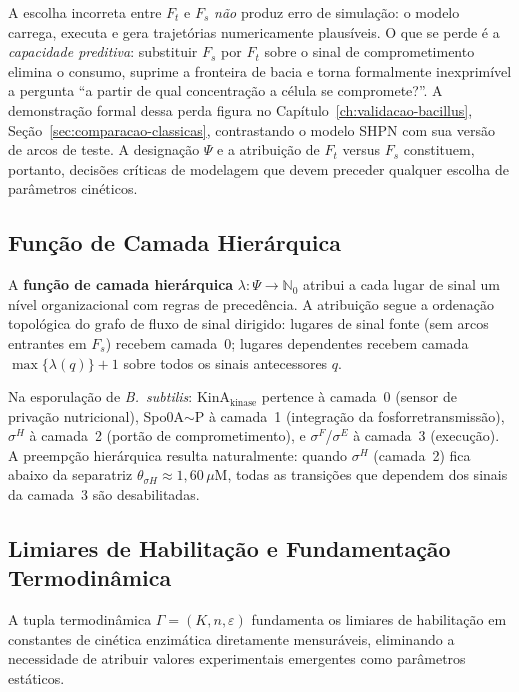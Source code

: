 \begin{remark}
\label{rem:decisao-silenciosa}
A escolha incorreta entre $F_t$ e $F_s$ \emph{não} produz erro de
simulação: o modelo carrega, executa e gera trajetórias numericamente
plausíveis. O que se perde é a \emph{capacidade preditiva}: substituir
$F_s$ por $F_t$ sobre o sinal de comprometimento elimina o consumo,
suprime a fronteira de bacia e torna formalmente inexprimível a
pergunta ``a partir de qual concentração a célula se compromete?''.
A demonstração formal dessa perda figura no
Capítulo~\ref{ch:validacao-bacillus},
Seção~\ref{sec:comparacao-classicas}, contrastando o modelo SHPN com
sua versão de arcos de teste. A designação $\Psi$ e a atribuição de
$F_t$ versus $F_s$ constituem, portanto, decisões críticas de
modelagem que devem preceder qualquer escolha de parâmetros
cinéticos.
\end{remark}

\subsection{Função de Camada Hierárquica}
\label{subsec:funcao-camada}

A \textbf{função de camada hierárquica} $\lambda: \Psi \to \mathbb{N}_0$ atribui
a cada lugar de sinal um nível organizacional com regras de precedência. A
atribuição segue a ordenação topológica do grafo de fluxo de sinal dirigido:
lugares de sinal fonte (sem arcos entrantes em $F_s$) recebem camada~0;
lugares dependentes recebem camada $\max\{\lambda(q)\} + 1$ sobre todos os
sinais antecessores $q$.

Na esporulação de \textit{B.~subtilis}: KinA$_{\text{kinase}}$ pertence à
camada~0 (sensor de privação nutricional), Spo0A${\sim}$P à camada~1
(integração da fosforretransmissão), $\sigma^H$ à camada~2 (portão de
comprometimento), e $\sigma^F$/$\sigma^E$ à camada~3 (execução). A
preempção hierárquica resulta naturalmente: quando $\sigma^H$ (camada~2) fica
abaixo da separatriz $\theta_{\sigma H} \approx 1{,}60\,\mu$M, todas as transições
que dependem dos sinais da camada~3 são desabilitadas.

\subsection{Limiares de Habilitação e Fundamentação Termodinâmica}
\label{subsec:limiares}

A tupla termodinâmica $\Gamma = (K, n, \varepsilon)$ fundamenta os limiares
de habilitação em constantes de cinética enzimática diretamente mensuráveis,
eliminando a necessidade de atribuir valores experimentais emergentes como
parâmetros estáticos.

